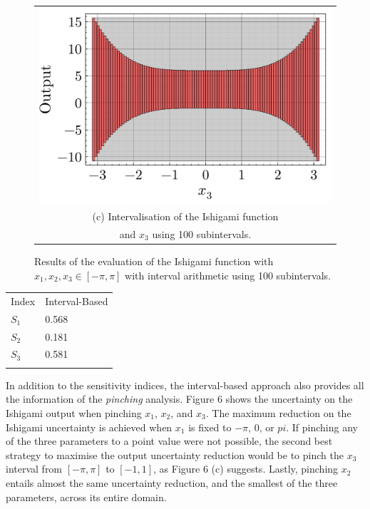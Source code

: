 \documentclass[twocolumn]{rps-esrel2022}
\begin{document}
\begin{figure}[!b]
	\begin{tabular}{@{}c@{}}
		\includegraphics[width=\linewidth]{figures/ishigami_3.pdf} \\[\abovecaptionskip]
		\small (c) Intervalisation of the Ishigami function\\
		\small and $x_3$ using 100 subintervals.
	  \end{tabular}

	\caption{Results of the evaluation of the Ishigami function with $x_1,x_2,x_3 \in [-\pi,\pi]$ with interval arithmetic using 100 subintervals.
	}
\end{figure}

\begin{table}[!h]
	{
	\begin{tabular}{@{}ll@{}}\toprule
	Index & Interval-Based\\
\colrule

	$S_1$ & 0.568 \\
	$S_2$ & 0.181 \\
	$S_3$ & 0.581 \\
\botrule
\end{tabular}}

\end{table}

In addition to the sensitivity indices, the interval-based approach also provides all the information of the \textit{pinching} analysis.
Figure 6 shows the uncertainty on the Ishigami output when pinching $x_1$, $x_2$, and $x_3$.
The maximum reduction on the Ishigami uncertainty is achieved when $x_1$ is fixed to $-\pi$, $0$, or $pi$.
If pinching any of the three parameters to a point value were not possible, the second best strategy to maximise the output uncertainty
reduction would be to pinch the $x_3$ interval from $[-\pi,\pi]$ to $[-1,1]$, as Figure 6 (c) suggests.
Lastly, pinching $x_2$ entails almost the same uncertainty reduction, and the smallest of the three parameters, across its entire domain.
\end{document}
